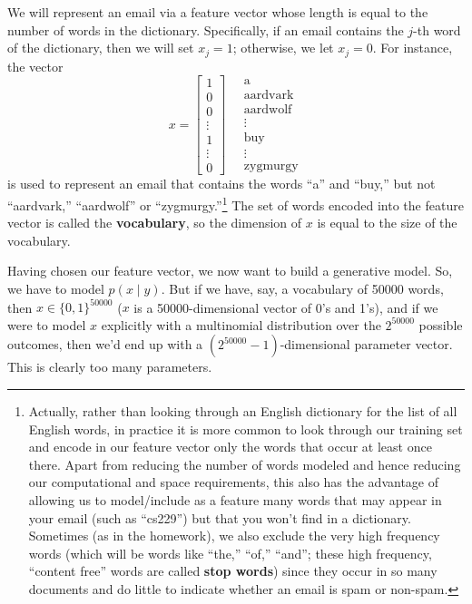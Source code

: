 We will represent an email via a feature vector whose length is equal to
the number of words in the dictionary. Specifically, if an email contains the
$j$-th word of the dictionary, then we will set $x_j = 1$; otherwise, we let $x_j = 0$.
For instance, the vector
\begin{equation*}
    x = \begin{bmatrix}
    1\\0\\0\\\vdots\\1\\\vdots\\0
    \end{bmatrix}\quad
    \begin{matrix}
    \text{a}\\\text{aardvark}\\\text{aardwolf}\\\vdots\\\text{buy}\\\vdots\\\text{zygmurgy}
    \end{matrix}
\end{equation*}
is used to represent an email that contains the words ``a'' and ``buy,'' but not
``aardvark,'' ``aardwolf'' or ``zygmurgy.''\footnote{
Actually, rather than looking through an English dictionary for the list of all English
words, in practice it is more common to look through our training set and encode in our
feature vector only the words that occur at least once there. Apart from reducing the
number of words modeled and hence reducing our computational and space requirements,
this also has the advantage of allowing us to model/include as a feature many words
that may appear in your email (such as ``cs229'') but that you won't find in a dictionary.
Sometimes (as in the homework), we also exclude the very high frequency words (which
will be words like ``the,'' ``of,'' ``and''; these high frequency, ``content free'' words are called
\textbf{stop words}) since they occur in so many documents and do little to indicate whether an
email is spam or non-spam.} The set of words encoded into the
feature vector is called the \textbf{vocabulary}, so the dimension of $x$ is equal to
the size of the vocabulary.

Having chosen our feature vector, we now want to build a generative
model. So, we have to model $p(x \mid y)$. But if we have, say, a vocabulary of
50000 words, then $x \in \{0,1\}^{50000}$ ($x$ is a 50000-dimensional vector of 0's and
1's), and if we were to model $x$ explicitly with a multinomial distribution over
the $2^{50000}$ possible outcomes, then we'd end up with a $(2^{50000} - 1)$-dimensional
parameter vector. This is clearly too many parameters.

